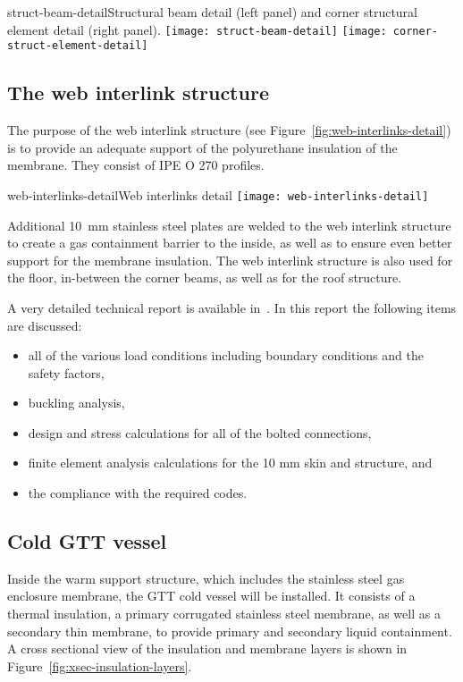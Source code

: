 \begin{cdrfigure}{struct-beam-detail}{Structural beam detail (left panel) and corner structural element detail (right panel).}
  \texttt{[image: struct-beam-detail]}
  \texttt{[image: corner-struct-element-detail]}
\end{cdrfigure}


\subsection{The web interlink structure}

The purpose of the web interlink structure (see Figure~\ref{fig:web-interlinks-detail}) is to provide an adequate support of the polyurethane insulation of the membrane. They consist of IPE O 270 profiles. 
%
\begin{cdrfigure}{web-interlinks-detail}{Web interlinks detail}
  \texttt{[image: web-interlinks-detail]}
\end{cdrfigure}


Additional \SI{10}{mm} stainless steel plates are welded to the web interlink structure to create a gas containment barrier to the inside, as well as to ensure even better support for the membrane insulation. 
The web interlink structure is also used for the floor, in-between the corner beams, as well as for the roof structure.

A very detailed technical report is available in~\cite{edms3}.
In this report the following items are discussed:
\begin{itemize}
\item all of the various load conditions including boundary conditions and the safety factors,
\item buckling analysis,
\item design and stress calculations for all of the bolted connections,
\item finite element analysis calculations for the 10 mm skin and structure, and
\item the compliance with the required codes.
\end{itemize}

\subsection{Cold GTT vessel}

Inside the warm support structure, which includes the stainless steel gas enclosure membrane, the GTT cold vessel will be installed. It consists of a thermal insulation, a primary corrugated stainless steel membrane, as well as a secondary thin membrane, to provide primary and secondary liquid containment. A cross sectional view of the insulation and membrane layers is shown in Figure~\ref{fig:xsec-insulation-layers}.

